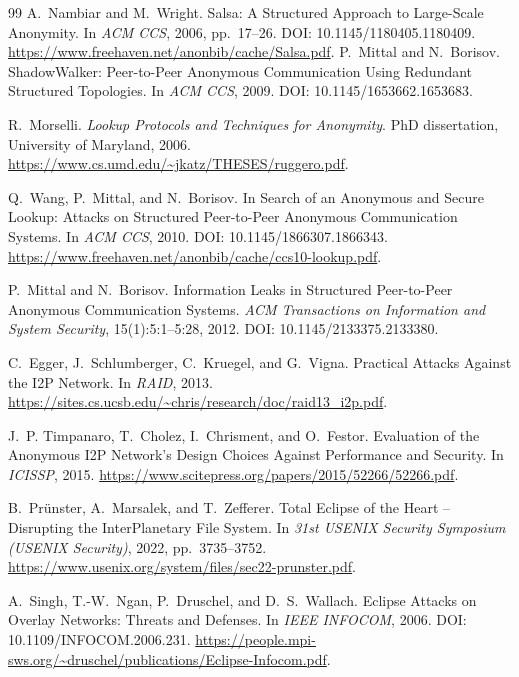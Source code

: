 \documentclass[11pt]{article}
\theoremstyle{definition}
\theoremstyle{remark}
\begin{document}
\begin{thebibliography}{99}
A.~Nambiar and M.~Wright.
\newblock Salsa: A Structured Approach to Large-Scale Anonymity.
\newblock In \emph{ACM CCS}, 2006, pp.~17--26.
\newblock DOI: 10.1145/1180405.1180409.
\newblock \url{https://www.freehaven.net/anonbib/cache/Salsa.pdf}.
P.~Mittal and N.~Borisov.
\newblock ShadowWalker: Peer-to-Peer Anonymous Communication Using Redundant Structured Topologies.
\newblock In \emph{ACM CCS}, 2009.
\newblock DOI: 10.1145/1653662.1653683.

R.~Morselli.
\newblock \emph{Lookup Protocols and Techniques for Anonymity}.
\newblock PhD dissertation, University of Maryland, 2006.
\newblock \url{https://www.cs.umd.edu/~jkatz/THESES/ruggero.pdf}.

Q.~Wang, P.~Mittal, and N.~Borisov.
\newblock In Search of an Anonymous and Secure Lookup: Attacks on Structured Peer-to-Peer Anonymous Communication Systems.
\newblock In \emph{ACM CCS}, 2010.
\newblock DOI: 10.1145/1866307.1866343.
\newblock \url{https://www.freehaven.net/anonbib/cache/ccs10-lookup.pdf}.

P.~Mittal and N.~Borisov.
\newblock Information Leaks in Structured Peer-to-Peer Anonymous Communication Systems.
\newblock \emph{ACM Transactions on Information and System Security}, 15(1):5:1--5:28, 2012.
\newblock DOI: 10.1145/2133375.2133380.

C.~Egger, J.~Schlumberger, C.~Kruegel, and G.~Vigna.
\newblock Practical Attacks Against the I2P Network.
\newblock In \emph{RAID}, 2013.
\newblock \url{https://sites.cs.ucsb.edu/~chris/research/doc/raid13_i2p.pdf}.

J.~P. Timpanaro, T.~Cholez, I.~Chrisment, and O.~Festor.
\newblock Evaluation of the Anonymous I2P Network's Design Choices Against Performance and Security.
\newblock In \emph{ICISSP}, 2015.
\newblock \url{https://www.scitepress.org/papers/2015/52266/52266.pdf}.

B.~Pr\"unster, A.~Marsalek, and T.~Zefferer.
\newblock Total Eclipse of the Heart -- Disrupting the InterPlanetary File System.
\newblock In \emph{31st USENIX Security Symposium (USENIX Security)}, 2022, pp.~3735--3752.
\newblock \url{https://www.usenix.org/system/files/sec22-prunster.pdf}.

A.~Singh, T.-W.~Ngan, P.~Druschel, and D.~S.~Wallach.
\newblock Eclipse Attacks on Overlay Networks: Threats and Defenses.
\newblock In \emph{IEEE INFOCOM}, 2006.
\newblock DOI: 10.1109/INFOCOM.2006.231.
\newblock \url{https://people.mpi-sws.org/~druschel/publications/Eclipse-Infocom.pdf}.


\end{thebibliography}
\end{document}
